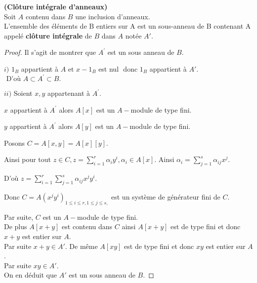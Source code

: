 \begin{moncorollaire}\textbf{(Clôture intégrale d'anneaux)}\cite{Di2}\\
	Soit $A $ contenu dans $ B$ une inclusion d'anneaux.\\
	L'ensemble des éléments de B entiers sur A est un sous-anneau de B contenant A appelé \textbf{clôture intégrale} de $B$ dans $A$ notée $A'$.
\end{moncorollaire}
\begin{proof}
	Il s'agit de montrer que $A^{\prime }$ est un sous anneau de $B.$
	
	$i)$ $1_B $ appartient à $ A \text{ et } x-1_B $ est nul $ \text{ donc } 1_B$ appartient à $ A'.$ \\
	$\text{ D'où } A\subset A^{\prime }\subset B.$
	
	$ii)$ Soient $x,y$ appartenant à $ A^{\prime }.$
	
	$x$ appartient à $ A^{\prime }$ alors $A[x]$ est un $A-$module de type fini.
	
	$y$ appartient à $ A^{\prime }$ alors $A[y]$ est un $A-$module de type fini.
	
	Posons $C=A[x,y]=A[x][y].$
	
	Ainsi pour tout $z\in C,z=\sum\limits_{i=1}^{r}\alpha _{i}y^{i},\alpha
	_{i}\in A[x].$ Ainsi $\alpha _{i}=\sum\limits_{j=1}^{s}\alpha _{ij}x^{j}.$
	
	D'où $z=\sum\limits_{i=1}^{r}\sum\limits_{j=1}^{s}\alpha _{ij}x^{j}y^{i}.$
	
	Donc $C=A(x^{j}y^{i})_{1\leq i\leq r,1\leq j\leq s,}$ est un système de générateur fini de $C.$
	
	Par suite, $C$ est un $A-$module de type fini.\\
	De plus $A[x+y] $ est contenu dans $ C$ ainsi $A[x+y]$ est de type fini et donc $x+y$ est entier sur $A$.\\ Par suite $x+y \in A'$. De même $A[xy]$ est de type fini et donc $xy$ est entier sur $A$.\\ Par suite $xy \in A'$. \\ On en déduit que $A'$ est un sous anneau de $B$.
\end{proof}

